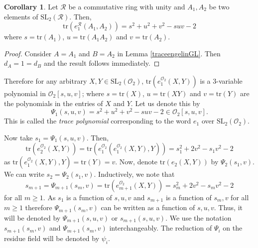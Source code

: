 \documentclass[10pt,twoside]{amsart}
\newcommand{\SL}{\mathrm{SL}}
\newcommand{\tr}{\mathrm{tr}}
\newcommand{\R}{\mathcal{O}_2}
\theoremstyle{definition}
\theoremstyle{definition}
\newtheorem{corollary}[theorem]{Corollary}
\begin{document}
\begin{corollary}
Let $\mathcal{R}$ be a commutative ring with unity and $A_1, A_2$ be two elements of $\SL_2(\mathcal{R})$. Then,  $$\tr(e_1^{\mathcal{R}}(A_1,A_2)) = s^2 + u^2 + v^2 - suv - 2$$ 
where $s=\tr(A_1)$, $u=\tr(A_1A_2)$ and $v=\tr(A_2)$. 
 \end{corollary}
\begin{proof}       
Consider $A=A_1$ and $B=A_2$ in Lemma \ref{traceengelinGL}. Then $d_A=1=d_B$ and the result follows immediately.

\end{proof}
\noindent Therefore for any arbitrary $X, Y\in \SL_2(\R)$, $\tr(e_1^{\R}(X, Y))$ is a $3$-variable polynomial in $\R[s, u, v]$; where $s=\tr(X)$, $u=\tr(XY)$ and $v=\tr(Y)$ are the polynomials in the entries of $X$ and $Y$. Let us denote this by 
$$\Psi_1(s, u, v) = s^2 + u^2 + v^2 - suv - 2 \in \R[s,u,v].$$ 
This is called the \emph{trace polynomial} corresponding to the word $e_1$ over $\SL_2(\R)$.

Now take $s_1 = \Psi_1(s, u, v)$. Then, $$\tr(e_2^{\R}(X, Y))= \tr(e_1^{\R}(e_1^{\R}(X, Y), Y)) = s_1^2 + 2v^2 - s_1v^2 -2$$ as $\tr(e_1^{\R}(X, Y), Y)= \tr(Y) = v$. Now, denote $\tr(e_2(X, Y))$ by $\Psi_2(s_1, v)$. We can write $s_2=\Psi_2(s_1, v)$. Inductively, we note that 
$$s_{m+1} = \Psi_{m+1}(s_m, v) = \tr(e_{m+1}^{\R}(X, Y)) = s_m^2 + 2v^2 - s_mv^2 -2$$ 
for all $m\geq 1$. As $s_1$ is a function of $s, u, v$ and $s_{m+1}$ is a function of $s_m, v$ for all $m\geq 1$ therefore $\Psi_{m+1}(s_m, v)$ can be written as a function of $s, u, v$. Thus, it will be denoted by $\Psi_{m+1}(s, u, v)$ or $s_{m+1}(s, u, v)$. We use the notation $s_{m+1}(s_m,v)$ and $\Psi_{m+1}(s_m, v)$ interchangeably. The reduction of $\Psi_i$ on the residue field will be denoted by $\psi_i$. 
\end{document}
